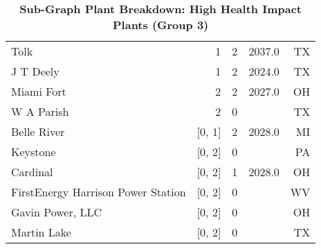 \begin{table}[htb]
\begin{adjustbox}{width=\textwidth}
\begin{tabular}{|l|r|r|r|r|}
              Tolk &         1 &           2 &           2037.0 &    TX \\
         J T Deely &         1 &           2 &           2024.0 &   TX \\
        Miami Fort &         2 &           2 &           2027.0 &    OH \\
        W A Parish &         2 &           0 &                &    TX \\
       Belle River &    [0, 1] &           2 &           2028.0 &    MI \\
          Keystone &    [0, 2] &           0 &                &    PA \\
          Cardinal &    [0, 2] &           1 &           2028.0 &    OH \\
FirstEnergy Harrison Power Station &    [0, 2] &           0 &                &    WV \\
  Gavin Power, LLC &    [0, 2] &           0 &                &    OH \\
       Martin Lake &    [0, 2] &           0 &                &    TX \\
         \bottomrule
        \end{tabular}
      \end{adjustbox}
      \caption{\textbf{Sub-Graph Plant Breakdown: High Health Impact Plants (Group 3)} }
      \label{group3-subgraph-Table}
      \end{table}
